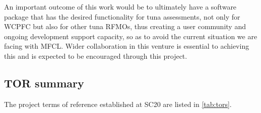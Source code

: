 \documentclass{SCreport}
\begin{document}
An important outcome of this work would be to ultimately have a software package
that has the desired functionality for tuna assessments, not only for WCPFC but
also for other tuna RFMOs, thus creating a user community and ongoing
development support capacity, so as to avoid the current situation we are facing
with MFCL. Wider collaboration in this venture is essential to achieving this
and is expected to be encouraged through this project.

\vspace{1ex}

\subsection{TOR summary}

The project terms of reference established at SC20 are listed in
\autoref{tab:tors}.

\newpage
\end{document}
